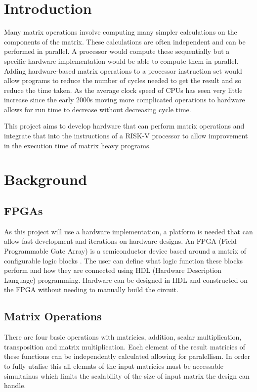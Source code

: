 \documentclass[a4paper,fleqn,12pt]{article}
\begin{document}
	
	
	
	\pagestyle{plain}
	
	\section{Introduction}
	Many matrix operations involve computing many simpler calculations on the components of the matrix. These calculations are often independent and can be performed in parallel. A processor would compute these sequentially but a specific hardware implementation would be able to compute them in parallel. Adding hardware-based matrix operations to a processor instruction set would allow programs to reduce the number of cycles needed to get the result and so reduce the time taken. As the average clock speed of CPUs has seen very little increase since the early 2000s moving more complicated operations to hardware allows for run time to decrease without decreasing cycle time.
	
	This project aims to develop hardware that can perform matrix operations and integrate that into the instructions of a RISK-V processor to allow improvement in the execution time of matrix heavy programs.
	
	\section{Background}
	\subsection{FPGAs}
	As this project will use a hardware implementation, a platform is needed that can allow fast development and iterations on hardware designs. An FPGA (Field Programmable Gate Array) is a semiconductor device based around a matrix of configurable logic blocks \citep{whatisanfpga}. The user can define what logic function these blocks perform and how they are connected using HDL (Hardware Description Language) programming. Hardware can be designed in HDL and constructed on the FPGA without needing to manually build the circuit.
	
	\subsection{Matrix Operations}
	There are four basic operations with matricies, addition, scalar multiplication, transposition and matrix multiplication. Each element of the result matricies of these functions can be independently calculated allowing for paralellism. In order to fully utalise this all elemnts of the input matricies must be accessable simultainus which limits the scalability of the size of input matrix the design can handle.
	
\end{document}
